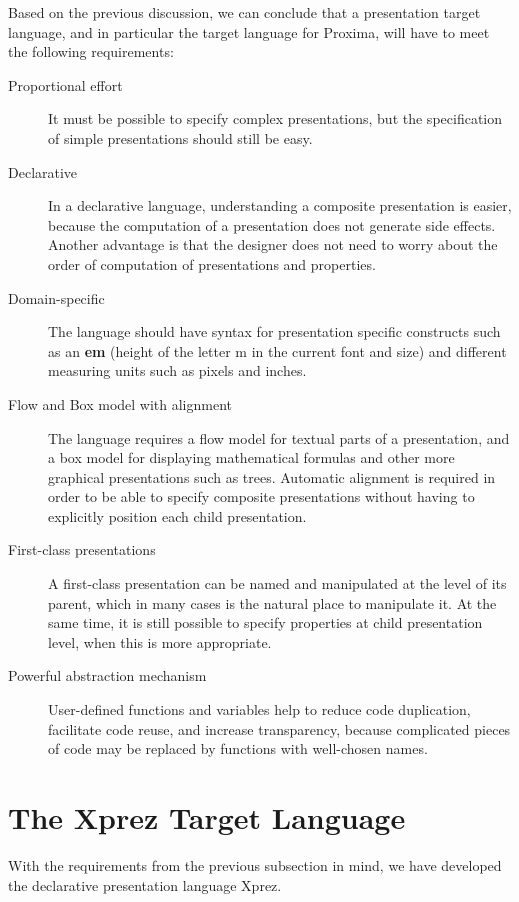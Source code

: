  Based on the previous discussion, we can conclude that a presentation target language, and in particular the target language for Proxima, will have to meet the following requirements: 

\begin{description}
\item[Proportional effort]
It must be possible to specify complex presentations, but the specification of simple presentations should still be easy.
\item[Declarative]
In a declarative language, understanding a composite presentation is easier, because the computation of a presentation does not generate side effects. Another advantage is that the designer does not need to worry about the order of computation of presentations and properties.
\item[Domain-specific]
The language should have syntax for presentation specific constructs such as an {\bf em} (height of the letter m in the current font and size) and different measuring units such as pixels and inches.
\item[Flow and Box model with alignment]
The language requires a flow model for textual parts of a presentation, and a box model for displaying mathematical formulas and other more graphical presentations such as trees. Automatic alignment is required in order to be able to specify composite presentations without having to explicitly position each child presentation.
\item[First-class presentations]
A first-class presentation can be named and manipulated at the level of its parent, which in many cases is the natural place to manipulate it. At the same time, it is still possible to specify properties at child presentation level, when this is more appropriate.
\item[Powerful abstraction mechanism]
User-defined functions and var\-i\-ables help to reduce code duplication, facilitate code reuse, and increase transparency, because complicated pieces of code may be replaced by functions with well-chosen names.
\end{description}


%																
%																
%																
\section{The {\sc Xprez} Target Language}
\label{xpreztarget}

With the requirements from the previous subsection in mind, we have developed the declarative presentation language {\sc Xprez}. 


